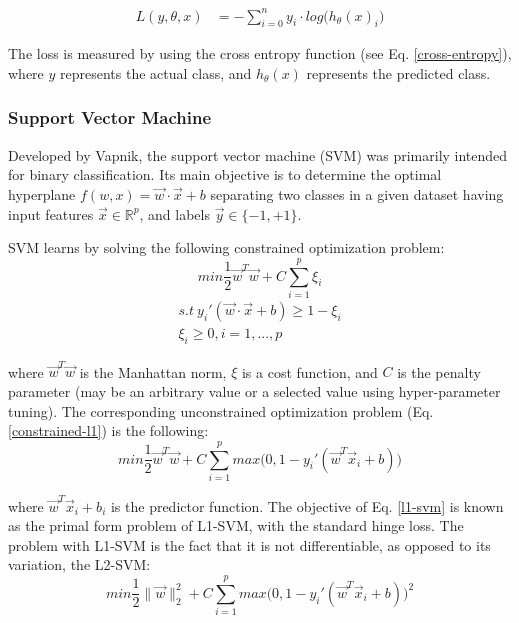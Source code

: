 \begin{align}\label{cross-entropy}
L(y, \theta, x)	&=	-\sum_{i = 0}^{n} y_{i} \cdot log\big(h_{\theta}(x)_{i}\big)
\end{align}

The loss is measured by using the cross entropy function (see Eq. \ref{cross-entropy}), where $y$ represents the actual class, and $h_{\theta}(x)$ represents the predicted class.

\subsubsection{Support Vector Machine}\label{svm}
Developed by Vapnik\cite{Cortes}, the support vector machine (SVM) was primarily intended for binary classification. Its main objective is to determine the optimal hyperplane $f(w, x) = \vec{w} \cdot \vec{x} + b$ separating two classes in a given dataset having input features $\vec{x} \in \mathbb{R}^{p}$, and labels $\vec{y} \in \{-1, +1\}$.

SVM learns by solving the following constrained optimization problem:
\begin{equation} \label{constrained-l1}
min \dfrac{1}{2}\vec{w}^{T}\vec{w} + C \sum_{i = 1}^{p} \xi_i
\end{equation}
\begin{align}
s.t\ y_{i}'(\vec{w} \cdot \vec{x} + b) \geq 1 - \xi_i\\
\xi_i \geq 0, i = 1, ..., p
\end{align}

where $\vec{w}^{T} \vec{w}$ is the Manhattan norm, $\xi$ is a cost function, and $C$ is the penalty parameter (may be an arbitrary value or a selected value using hyper-parameter tuning). The corresponding unconstrained optimization problem (Eq. \ref{constrained-l1}) is the following:
\begin{equation} \label{l1-svm}
min \dfrac{1}{2}\vec{w}^{T}\vec{w} + C \sum_{i = 1}^{p} max\big(0, 1 - y_{i}'(\vec{w}^{T}\vec{x}_{i}+b)\big)
\end{equation}

\indent where $\vec{w}^T\vec{x}_{i} + b_{i}$ is the predictor function. The objective of Eq. \ref{l1-svm} is known as the primal form problem of L1-SVM, with the standard hinge loss. The problem with L1-SVM is the fact that it is not differentiable\cite{Tang}, as opposed to its variation, the L2-SVM:
\begin{equation}\label{l2-svm}
min \dfrac{1}{2}\|\vec{w}\|_{2}^{2} + C \sum_{i = 1}^{p} max\big(0, 1 - y_{i}'(\vec{w}^{T}\vec{x}_{i}+b)\big)^{2}
\end{equation}

